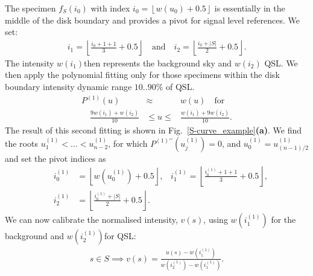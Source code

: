 \documentclass{aa}
\newcommand{\eqnl}[2]{\begin{eqnarray}\label{#1}#2\end{eqnarray}}
\newcommand{\floor}[1]{\left\lfloor #1 \right\rfloor}
\begin{document}
  The specimen $f_S(i_0)$ with index $i_0 = \floor{w(u_0)+0.5}$ is essentially
  in the middle of the disk boundary and provides a pivot for signal level
  references.
  We set:
  \eqnl{scurve-pivots}{
  i_1 = \floor{\frac{i_0 + 1 + 1}{3} + 0.5} \quad \text{and} \quad
  i_2 = \floor{\frac{i_0 + |S|}{2} + 0.5} \text{.}
  }
  The intensity $w(i_1)$then represents the background sky and $w(i_2)$ QSL.
  We then apply the polynomial fitting only for those specimens within the
  disk boundary intensity dynamic range $10 .. 90 \%$ of QSL.
  \eqnl{scurve-approx1}{
  P^{(1)}(u) &\approx& w(u) \quad \text{for}\\ \quad \frac{9 w(i_1) + w(i_2)}{10} &\le u \le& \frac{w(i_1) + 9 w(i_2)}{10} \text{.} \nonumber
  }
  The result of this second fitting is shown in
  Fig.~\ref{S-curve_example}{\bf(a)}. 
  We find the roots $u_1^{(1)}< ... < u_{n-2}^{(1)}$, for which
  $P^{(1)\prime\prime}(u_j^{(1)}) = 0$, and $u_0^{(1)} = u_{{(n-1)}/{2}}^{(1)}$ 
  and set the pivot indices 
  as
  \eqnl{scurve-pivots1}{
  &i_0^{(1)}& = \floor{w(u_0^{(1)})+0.5}
  \text{,}
  \quad i_1^{(1)} = \floor{\frac{i_0^{(1)} + 1 + 1}{3} + 0.5} 
  \text{,} 
  \nonumber \\
  &i_2^{(1)}& = \floor{\frac{i_0^{(1)} + |S|}{2} + 0.5} \text{.}
  }
  We can now calibrate the normalised intensity, $v(s)$,
  using $w(i_1^{(1)})$ for the background and $w(i_2^{(1)})$for QSL:
  \eqnl{scurve-calibration}{
  s \in S \implies v(s) = \frac{u(s) - w(i_1^{(1)})}{w(i_2^{(1)}) - w(i_1^{(1)})} \text{.}
  }
\end{document}
